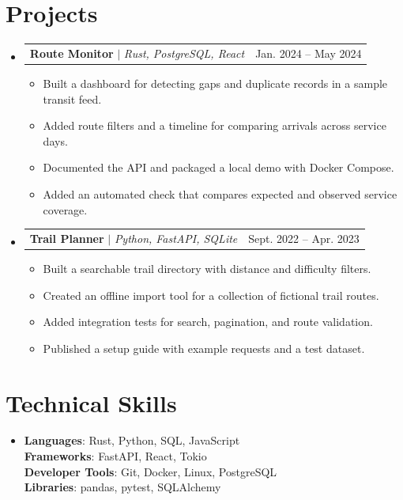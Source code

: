 \documentclass[letterpaper,11pt]{article}
\makeatletter
\newcommand{\resumeItem}[1]{
  \item\small{
    {#1 \vspace{-2pt}}
  }
}
\newcommand{\resumeProjectHeading}[2]{
  \item
  \begin{tabular*}{0.97\textwidth}{l@{\extracolsep{\fill}}r}
    \small#1 & #2 \\
  \end{tabular*}\vspace{-7pt}
}
\newcommand{\resumeSubHeadingListStart}{\begin{itemize}[leftmargin=0.15in, label={}]}
\newcommand{\resumeSubHeadingListEnd}{\end{itemize}}
\newcommand{\resumeItemListStart}{\begin{itemize}}
\newcommand{\resumeItemListEnd}{\end{itemize}\vspace{-5pt}}
\makeatother
\begin{document}
\section{Projects}
\resumeSubHeadingListStart
  \resumeProjectHeading
    {\textbf{Route Monitor} $|$ \emph{Rust, PostgreSQL, React}}{Jan. 2024 -- May 2024}
  \resumeItemListStart
    \resumeItem{Built a dashboard for detecting gaps and duplicate records in a sample transit feed.}
    \resumeItem{Added route filters and a timeline for comparing arrivals across service days.}
    \resumeItem{Documented the API and packaged a local demo with Docker Compose.}
    \resumeItem{Added an automated check that compares expected and observed service coverage.}
  \resumeItemListEnd

  \resumeProjectHeading
    {\textbf{Trail Planner} $|$ \emph{Python, FastAPI, SQLite}}{Sept. 2022 -- Apr. 2023}
  \resumeItemListStart
    \resumeItem{Built a searchable trail directory with distance and difficulty filters.}
    \resumeItem{Created an offline import tool for a collection of fictional trail routes.}
    \resumeItem{Added integration tests for search, pagination, and route validation.}
    \resumeItem{Published a setup guide with example requests and a test dataset.}
  \resumeItemListEnd
\resumeSubHeadingListEnd

\section{Technical Skills}
\begin{itemize}[leftmargin=0.15in, label={}]
  \small\item
    \textbf{Languages}: Rust, Python, SQL, JavaScript \\
    \textbf{Frameworks}: FastAPI, React, Tokio \\
    \textbf{Developer Tools}: Git, Docker, Linux, PostgreSQL \\
    \textbf{Libraries}: pandas, pytest, SQLAlchemy
\end{itemize}
\end{document}
